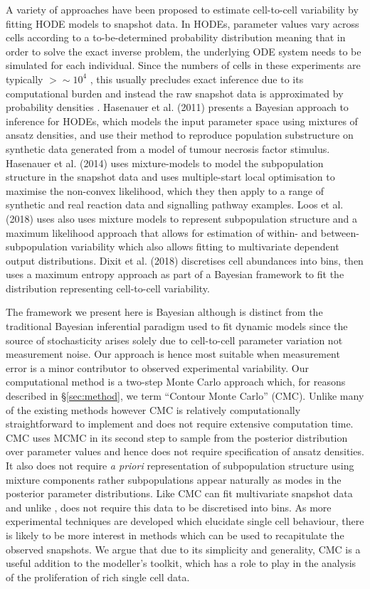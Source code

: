 \documentclass[10pt,letterpaper]{article}
\begin{document}
A variety of approaches have been proposed to estimate cell-to-cell variability by fitting HODE models to snapshot data. In HODEs, parameter values vary across cells according to a to-be-determined probability distribution meaning that in order to solve the exact inverse problem, the underlying ODE system needs to be simulated for each individual. Since the numbers of cells in these experiments are typically $>\sim10^4$ \cite{hasenauer2011identification}, this usually precludes exact inference due to its computational burden and instead the raw snapshot data is approximated by probability densities \cite{hasenauer2011identification,hasenauer2014ode,loos2018hierarchical,dixit2018maximum}. Hasenauer et al. (2011) presents a Bayesian approach to inference for HODEs, which models the input parameter space using mixtures of ansatz densities, and use their method to reproduce population substructure on synthetic data generated from a model of tumour necrosis factor stimulus. Hasenauer et al. (2014) uses mixture-models to model the subpopulation structure in the snapshot data and uses multiple-start local optimisation to maximise the non-convex likelihood, which they then apply to a range of synthetic and real reaction data and signalling pathway examples. Loos et al. (2018) uses also uses mixture models to represent subpopulation structure and a maximum likelihood approach that allows for estimation of within- and between-subpopulation variability which also allows fitting to multivariate dependent output distributions. Dixit et al. (2018) discretises cell abundances into bins, then uses a maximum entropy approach as part of a Bayesian framework to fit the distribution representing cell-to-cell variability.

The framework we present here is Bayesian although is distinct from the traditional Bayesian inferential paradigm used to fit dynamic models since the source of stochasticity arises solely due to cell-to-cell parameter variation not measurement noise. Our approach is hence most suitable when measurement error is a minor contributor to observed experimental variability. Our computational method is a two-step Monte Carlo approach which, for reasons described in \S \ref{sec:method}, we term ``Contour Monte Carlo'' (CMC). Unlike many of the existing methods however CMC is relatively computationally straightforward to implement and does not require extensive computation time. CMC uses MCMC in its second step to sample from the posterior distribution over parameter values and hence does not require specification of ansatz densities. It also does not require \textit{a priori} representation of subpopulation structure using mixture components rather subpopulations appear naturally as modes in the posterior parameter distributions. Like \cite{loos2018hierarchical} CMC can fit multivariate snapshot data and unlike \cite{dixit2018maximum}, does not require this data to be discretised into bins. As more experimental techniques are developed which elucidate single cell behaviour, there is likely to be more interest in methods which can be used to recapitulate the observed snapshots. We argue that due to its simplicity and generality, CMC is a useful addition to the modeller's toolkit, which has a role to play in the analysis of the proliferation of rich single cell data.
\end{document}
